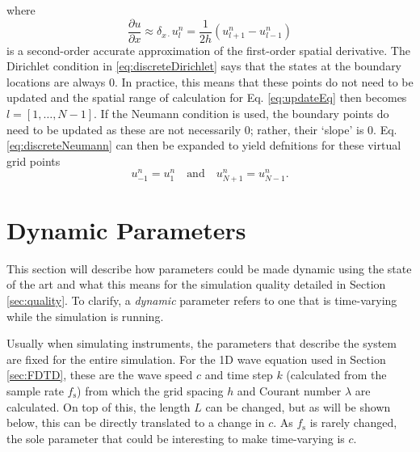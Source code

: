 \documentclass[dvipsnames, preprint]{JASA}
\begin{document}
where 
\begin{equation}
    \frac{\partial u}{\partial x} \approx \delta_{x\cdot}u_l^n = \frac{1}{2h}\left(u_{l+1}^n - u_{l-1}^n\right)
\end{equation}
is a second-order accurate approximation of the first-order spatial derivative. The Dirichlet condition in \eqref{eq:discreteDirichlet} says that the states at the boundary locations are always 0. In practice, this means that these points do not need to be updated and the spatial range of calculation for Eq. \eqref{eq:updateEq} then becomes $l = [1, \hdots, N-1]$. If the Neumann condition is used, the boundary points do need to be updated as these are not necessarily $0$; rather, their `slope' is $0$. Eq. \eqref{eq:discreteNeumann} can then be expanded to yield defnitions for these virtual grid points
\begin{equation}
    u_{-1}^n = u_1^n \quad \text{and} \quad u_{N+1}^n = u_{N-1}^n.
\end{equation}


\section{Dynamic Parameters}
This section will describe how parameters could be made dynamic using the state of the art and what this means for the simulation quality detailed in Section \ref{sec:quality}. %
To clarify, a \textit{dynamic} parameter refers to one that is time-varying while the simulation is running. 

Usually when simulating instruments, the parameters that describe the system are fixed for the entire simulation. For the 1D wave equation used in Section \ref{sec:FDTD}, these are the wave speed $c$ and time step $k$ (calculated from the sample rate $f_\text{s}$) from which the grid spacing $h$ and Courant number $\lambda$ are calculated. On top of this, the length $L$ can be changed, but as will be shown below, this can be directly translated to a change in $c$. As $f_\text{s}$ is rarely changed, the sole parameter that could be interesting to make time-varying is $c$. 

%
%
\end{document}
